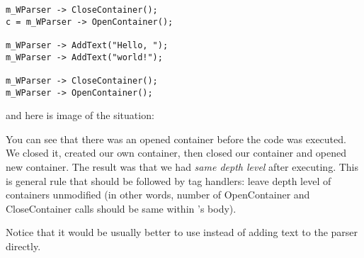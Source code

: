 \begin{verbatim}
m_WParser -> CloseContainer();
c = m_WParser -> OpenContainer();

m_WParser -> AddText("Hello, ");
m_WParser -> AddText("world!");

m_WParser -> CloseContainer();
m_WParser -> OpenContainer();
\end{verbatim}

and here is image of the situation:

You can see that there was an opened container before the code was executed.
We closed it, created our own container, then closed our container and opened
new container. The result was that we had {\it same depth level} after
executing. This is general rule that should be followed by tag handlers:
leave depth level of containers unmodified (in other words, number of
OpenContainer and CloseContainer calls should be same within 's body).

Notice that it would be usually better to use 
 instead
of adding text to the parser directly.

